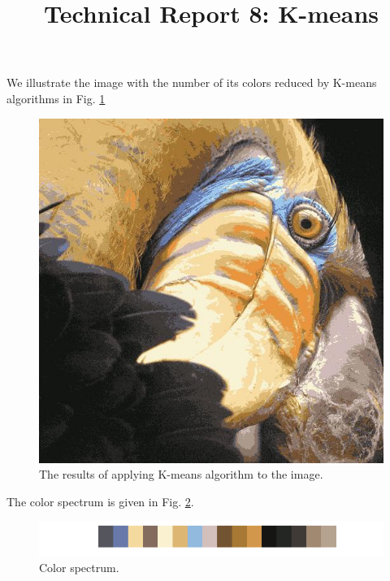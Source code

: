 \documentclass[10pt,a4paper]{article}
\date{}
\begin{document}
\title{Technical Report 8: K-means}

\maketitle

We illustrate the image with the number of its colors reduced by K-means algorithms in Fig. \ref{fig:rel}
%
%
    \begin{figure}[htb!]
       \begin{center}
       \includegraphics[width=.9\columnwidth]{bird_kmeans}
       \end{center}
       \caption{The results of applying K-means algorithm to the image.}
       \label{fig:rel}
    \end{figure}
%
The color spectrum is given in Fig. \ref{fig:spc}.
%
\begin{figure}[htb!]
       \begin{center}
       \includegraphics[width=.9\columnwidth]{colors}
       \end{center}
       \caption{Color spectrum.}
              \label{fig:spc}
    \end{figure}
%
\end{document}
